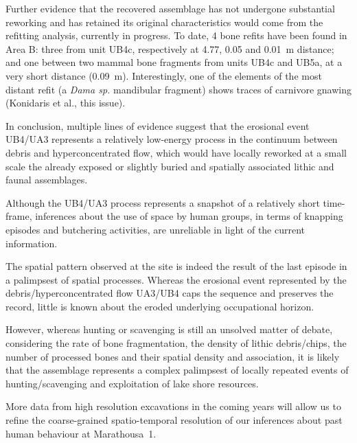 \documentclass[preprint,authoryear,times]{elsarticle} %
\begin{document}
Further evidence that the recovered assemblage has not undergone substantial reworking and has retained its original characteristics would come from the refitting analysis, currently in progress. To date, 4 bone refits have been found in Area B: three from unit UB4c, respectively at 4.77, 0.05 and 0.01~m distance; and one between two mammal bone fragments from units UB4c and UB5a, at a very short distance (0.09~m). Interestingly, one of the elements of the most distant refit (a \emph{Dama sp.} mandibular fragment) shows traces of carnivore gnawing (Konidaris et al., this issue).

In conclusion, multiple lines of evidence suggest that the erosional event UB4/UA3 represents a relatively low-energy process in the continuum between debris and hyperconcentrated flow, which would have locally reworked at a small scale the already exposed or slightly buried and spatially associated lithic and faunal assemblages.

Although the UB4/UA3 process represents a snapshot of a relatively short time-frame, inferences about the use of space by human groups, in terms of knapping episodes and butchering activities, are unreliable in light of the current information.

The spatial pattern observed at the site is indeed the result of the last episode in a palimpsest of spatial processes. Whereas the erosional event represented by the debris/hyperconcentrated flow UA3/UB4 caps the sequence and preserves the record, little is known about the eroded underlying occupational horizon.

However, whereas hunting or scavenging is still an unsolved matter of debate, considering the rate of bone fragmentation, the density of lithic debris/chips, the number of processed bones and their spatial density and association, it is likely that the assemblage represents a complex palimpsest of locally repeated events of hunting/scavenging and exploitation of lake shore resources. %

More data from high resolution excavations in the coming years will allow us to refine the coarse-grained spatio-temporal resolution of our inferences about past human behaviour at Marathousa~1.
\end{document}
